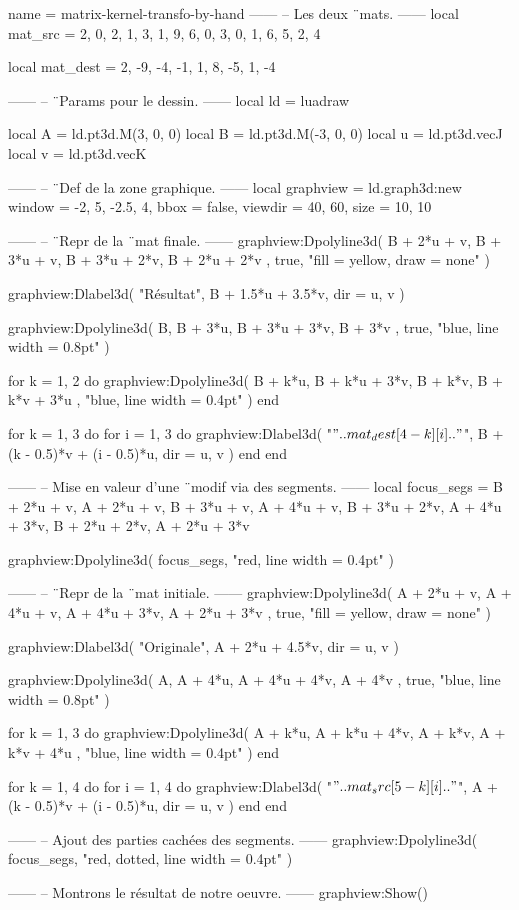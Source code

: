 \documentclass[border = 3pt]{standalone}
\begin{document}
\begin{luadraw*}{name = matrix-kernel-transfo-by-hand}
------
-- Les deux ¨mats.
------
local mat_src = {
  {2, 0, 2, 1},
  {3, 1, 9, 6},
  {0, 3, 0, 1},
  {6, 5, 2, 4}
}

local mat_dest = {
  {2, -9, -4},
  {-1, 1, 8},
  {-5, 1, -4}
}

------
-- ¨Params pour le dessin.
------
local ld = luadraw

local A = ld.pt3d.M(3, 0, 0)
local B = ld.pt3d.M(-3, 0, 0)
local u = ld.pt3d.vecJ
local v = ld.pt3d.vecK

------
-- ¨Def de la zone graphique.
------
local graphview = ld.graph3d:new{
  window  = {-2, 5, -2.5, 4},
  bbox    = false,
  viewdir = {40, 60},
  size    = {10, 10}
}

------
-- ¨Repr de la ¨mat finale.
------
graphview:Dpolyline3d(
  {
    B + 2*u + v,
    B + 3*u + v,
    B + 3*u + 2*v,
    B + 2*u + 2*v
  },
  true,
  "fill = yellow, draw = none"
)

graphview:Dlabel3d(
  "Résultat", B + 1.5*u + 3.5*v,
  {
    dir = {u, v}
  }
)

graphview:Dpolyline3d(
  {
    B,
    B + 3*u,
    B + 3*u + 3*v,
    B + 3*v
  },
  true,
  "blue, line width = 0.8pt"
)

for k = 1, 2 do
  graphview:Dpolyline3d(
    {
      {B + k*u, B + k*u + 3*v},
      {B + k*v, B + k*v + 3*u}
    },
    "blue, line width = 0.4pt"
  )
end

for k = 1, 3 do
  for i = 1, 3 do
    graphview:Dlabel3d(
      "$" .. mat_dest[4 - k][i] .. "$",
      B + (k - 0.5)*v + (i - 0.5)*u,
      {
        dir = {u, v}
      }
    )
  end
end

------
-- Mise en valeur d'une ¨modif via des segments.
------
local focus_segs = {
  {B + 2*u + v, A + 2*u + v},
  {B + 3*u + v, A + 4*u + v},
  {B + 3*u + 2*v, A + 4*u + 3*v},
  {B + 2*u + 2*v, A + 2*u + 3*v}
}

graphview:Dpolyline3d(
  focus_segs,
  "red, line width = 0.4pt"
)

------
-- ¨Repr de la ¨mat initiale.
------
graphview:Dpolyline3d(
  {
    A + 2*u + v,
    A + 4*u + v,
    A + 4*u + 3*v,
    A + 2*u + 3*v
  },
  true,
  "fill = yellow, draw = none"
)

graphview:Dlabel3d(
  "Originale", A + 2*u + 4.5*v,
  {
    dir = {u, v}
  }
)

graphview:Dpolyline3d(
  {
    A,
    A + 4*u,
    A + 4*u + 4*v,
    A + 4*v
  },
  true,
  "blue, line width = 0.8pt"
)

for k = 1, 3 do
  graphview:Dpolyline3d(
    {
      {A + k*u, A + k*u + 4*v},
      {A + k*v, A + k*v + 4*u}
    },
    "blue, line width = 0.4pt"
  )
end

for k = 1, 4 do
  for i = 1, 4 do
    graphview:Dlabel3d(
      "$" .. mat_src[5 - k][i] .. "$",
      A + (k - 0.5)*v + (i - 0.5)*u,
      {
        dir = {u, v}
      }
    )
  end
end

------
-- Ajout des parties cachées des segments.
------
graphview:Dpolyline3d(
  focus_segs,
  "red, dotted, line width = 0.4pt"
)

------
-- Montrons le résultat de notre oeuvre.
------
graphview:Show()
\end{luadraw*}
\end{document}
